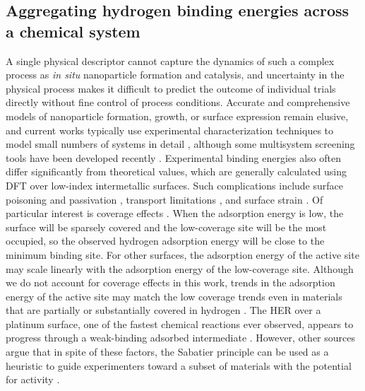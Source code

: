 \documentclass[preprint,12pt]{elsarticle}
\begin{document}
\subsection{Aggregating hydrogen binding energies across a chemical system}
A single physical descriptor cannot capture the dynamics of such a complex process as {\it in situ} nanoparticle formation and catalysis, and uncertainty in the physical process makes it difficult to predict the outcome of individual trials directly without fine control of process conditions. Accurate and comprehensive models of nanoparticle formation, growth, or surface expression remain elusive, and current works typically use experimental characterization techniques to model small numbers of systems in detail \cite{chen2019kinetics,ma2019toward,gamler2019achieving}, although some multisystem screening tools have been developed recently \cite{wahl2021machine,li2019intermetallic,palizhati2019toward}. Experimental binding energies also often differ significantly from theoretical values, which are generally calculated using DFT over low-index intermetallic surfaces. Such complications include surface poisoning and passivation \cite{quaino2014volcano}, transport limitations \cite{rheinlander2013comparing}, and surface strain \cite{khorshidi2018strain}. Of particular interest is coverage effects \cite{frey2014implications}. When the adsorption energy is low, the surface will be sparsely covered and the low-coverage site will be the most occupied, so the observed hydrogen adsorption energy will be close to the minimum binding site. For other surfaces, the adsorption energy of the active site may scale linearly with the adsorption energy of the low-coverage site. Although we do not account for coverage effects in this work, trends in the adsorption energy of the active site may match the low coverage trends even in materials that are partially or substantially covered in hydrogen \cite{lausche2013effect}. The HER over a platinum surface, one of the fastest chemical reactions ever observed, appears to progress through a weak-binding adsorbed intermediate \cite{lindgren2019challenge,ooka2021non}. However, other sources argue that in spite of these factors, the Sabatier principle can be used as a heuristic to guide experimenters toward a subset of materials with the potential for activity \cite{ulissi2011effect,schipper2018effects}. 
\end{document}
